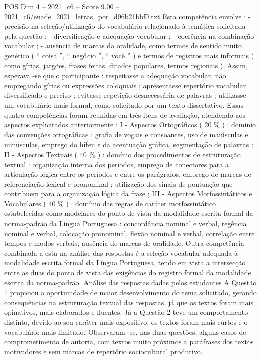 \begin{textsample}{POS Dim 4 – 2021\_c6 – Score 9.00 – 2021\_c6/enade\_2021\_letras\_por\_d96b21bbf0.txt}
Esta competência envolve : - precisão na seleção/utilização do vocabulário relacionado à temática solicitada pela questão ; - diversificação e adequação vocabular ; - coerência na combinação vocabular ; - ausência de marcas da oralidade, como termos de sentido muito genérico ( “ coisa ”, “ negócio ”, “ você ” ) e termos de registros mais informais ( como gírias, jargões, frases feitas, ditados populares, termos regionais ).
Assim, esperava -se que o participante : respeitasse a adequação vocabular, não empregando gírias ou expressões coloquiais ; apresentasse repertório vocabular diversificado e preciso ; evitasse repetição desnecessária de palavras ; utilizasse um vocabulário mais formal, como solicitado por um texto dissertativo.
Essas quatro competências foram reunidas em três itens de avaliação, atendendo aos aspectos explicitados anteriormente : I - Aspectos Ortográficos ( 20 \% ) : domínio das convenções ortográficas : grafia de vogais e consoantes, uso de maiúsculas e minúsculas, emprego do hífen e da acentuação gráfica, segmentação de palavras ; II - Aspectos Textuais ( 40 \% ) : domínio dos procedimentos de estruturação textual : organização interna dos períodos, emprego de conectores para a articulação lógica entre os períodos e entre os parágrafos, emprego de marcas de referenciação lexical e pronominal ; utilização dos sinais de pontuação que contribuem para a organização lógica da frase ; III - Aspectos Morfossintáticos e Vocabulares ( 40 \% ) : domínio das regras de caráter morfossintático estabelecidas como modelares do ponto de vista da modalidade escrita formal da norma-padrão da Língua Portuguesa : concordância nominal e verbal, regência nominal e verbal, colocação pronominal, flexão nominal e verbal, correlação entre tempos e modos verbais, ausência de marcas de oralidade.
Outra competência combinada a esta na análise das respostas é a seleção vocabular adequada à modalidade escrita formal da Língua Portuguesa, tendo em vista a intersecção entre as duas do ponto de vista das exigências do registro formal da modalidade escrita da norma-padrão.
Análise das respostas dadas pelos estudantes A Questão 1 propiciou a oportunidade de maior desenvolvimento do tema solicitado, gerando consequências na estruturação textual das respostas, já que os textos foram mais opinativos, mais elaborados e fluentes.
Já a Questão 2 teve um comportamento distinto, devido ao seu caráter mais expositivo, os textos foram mais curtos e o vocabulário mais limitado.
Observaram -se, nas duas questões, alguns casos de comprometimento de autoria, com textos muito próximos a paráfrases dos textos motivadores e sem marcas de repertório sociocultural produtivo.

\end{textsample}
